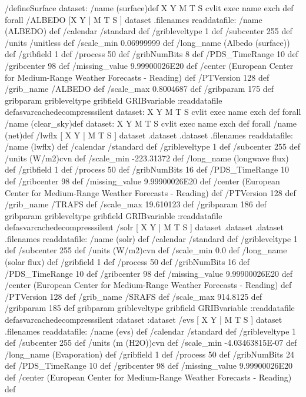\begin{ingrid}
/defineSurface {
dataset:
/name (surface)def
{ X Y M T S} cvlit { exec name exch def} forall
 /ALBEDO{  
[X Y | M T S ] dataset .filenames readdatafile:
/name (ALBEDO) def
 /calendar /standard def
 /gribleveltype 1 def
 /subcenter 255 def
 /units /unitless def
 /scale_min 0.06999999 def
 /long_name (Albedo (surface)) def
 /gribfield 1 def
 /process 50 def
 /gribNumBits 8 def
 /PDS_TimeRange 10 def
 /gribcenter 98 def
 /missing_value 9.99900026E20 def
 /center (European Center for Medium-Range Weather Forecasts - Reading) def
 /PTVersion 128 def
 /grib_name /ALBEDO def
 /scale_max 0.8004687 def
 /gribparam 175 def
gribparam gribleveltype gribfield GRIBvariable
:readdatafile
}defasvarcachedecompresssilent
dataset:
{ X Y M T S} cvlit { exec name exch def} forall
/name (clear_sky)def
dataset:
{ X Y M T S} cvlit { exec name exch def} forall
/name (net)def
 /lwflx{
[ X Y | M T S ] dataset .dataset .dataset .filenames readdatafile:
/name (lwflx) def
 /calendar /standard def
 /gribleveltype 1 def
 /subcenter 255 def
 /units (W/m2)cvn def
 /scale_min -223.31372 def
 /long_name (longwave flux) def
 /gribfield 1 def
 /process 50 def
 /gribNumBits 16 def
 /PDS_TimeRange 10 def
 /gribcenter 98 def
 /missing_value 9.99900026E20 def
 /center (European Center for Medium-Range Weather Forecasts - Reading) def
 /PTVersion 128 def
 /grib_name /TRAFS def
 /scale_max 19.610123 def
 /gribparam 186 def
 gribparam gribleveltype gribfield GRIBvariable
 :readdatafile
}defasvarcachedecompresssilent
 /solr{
[ X Y | M T S ] dataset .dataset .dataset .filenames readdatafile:
/name (solr) def
 /calendar /standard def
 /gribleveltype 1 def
 /subcenter 255 def
 /units (W/m2)cvn def
 /scale_min 0.0 def
 /long_name (solar flux) def
 /gribfield 1 def
 /process 50 def
 /gribNumBits 16 def
 /PDS_TimeRange 10 def
 /gribcenter 98 def
 /missing_value 9.99900026E20 def
 /center (European Center for Medium-Range Weather Forecasts - Reading) def
 /PTVersion 128 def
 /grib_name /SRAFS def
 /scale_max 914.8125 def
 /gribparam 185 def
 gribparam gribleveltype gribfield GRIBvariable
 :readdatafile
}defasvarcachedecompresssilent
:dataset
:dataset
 /evs{
[ X Y | M T S ] dataset .filenames readdatafile:
/name (evs) def
 /calendar /standard def
 /gribleveltype 1 def
 /subcenter 255 def
 /units (m (H2O))cvn def
 /scale_min -4.03463815E-07 def
 /long_name (Evaporation) def
 /gribfield 1 def
 /process 50 def
 /gribNumBits 24 def
 /PDS_TimeRange 10 def
 /gribcenter 98 def
 /missing_value 9.99900026E20 def
 /center (European Center for Medium-Range Weather Forecasts - Reading) def
}}
\end{ingrid}
